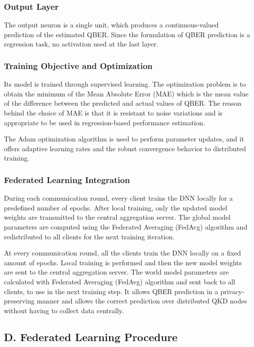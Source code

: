 \documentclass[conference]{IEEEtran}
\begin{document}
\subsubsection{ Output Layer}

The output neuron is a single unit, which produces a continuous-valued prediction of the estimated QBER. Since the formulation of QBER prediction is a regression task, no activation used at the last layer. 

 

\subsubsection{ Training Objective and Optimization}

Its model is trained through supervised learning. The optimization problem is to obtain the minimum of the Mean Absolute Error (MAE) which is the mean value of the difference between the predicted and actual values of QBER. The reason behind the choice of MAE is that it is resistant to noise variations and is appropriate to be used in regression-based performance estimation. 

The Adam optimization algorithm is used to perform parameter updates, and it offers adaptive learning rates and the robust convergence behavior to distributed training. 
\subsubsection{ Federated Learning Integration}

During each communication round, every client trains the DNN locally for a predefined number of epochs. After local training, only the updated model weights are transmitted to the central aggregation server. The global model parameters are computed using the Federated Averaging (FedAvg) algorithm and redistributed to all clients for the next training iteration.

At every communication round, all the clients train the DNN locally on a fixed amount of epochs. Local training is performed and then the new model weights are sent to the central aggregation server. The world model parameters are calculated with Federated Averaging (FedAvg) algorithm and sent back to all clients, to use in the next training step.
It allows QBER prediction in a privacy-preserving manner and allows the correct prediction over distributed QKD nodes without having to collect data centrally. 


\subsection*{D. Federated Learning Procedure}
\end{document}
